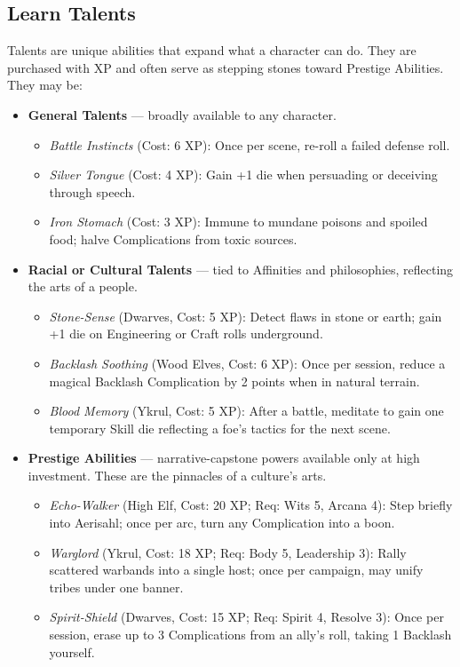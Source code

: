 \documentclass[12pt]{article}
\begin{document}
\subsection{Learn Talents}
Talents are unique abilities that expand what a character can do. They are purchased with XP and often serve as stepping stones toward Prestige Abilities. They may be:

\begin{itemize}
  \item \textbf{General Talents} — broadly available to any character.  
  \begin{itemize}
    \item \emph{Battle Instincts} (Cost: 6 XP): Once per scene, re-roll a failed defense roll.  
    \item \emph{Silver Tongue} (Cost: 4 XP): Gain +1 die when persuading or deceiving through speech.  
    \item \emph{Iron Stomach} (Cost: 3 XP): Immune to mundane poisons and spoiled food; halve Complications from toxic sources.  
  \end{itemize}

  \item \textbf{Racial or Cultural Talents} — tied to Affinities and philosophies, reflecting the arts of a people.  
  \begin{itemize}
    \item \emph{Stone-Sense} (Dwarves, Cost: 5 XP): Detect flaws in stone or earth; gain +1 die on Engineering or Craft rolls underground.  
    \item \emph{Backlash Soothing} (Wood Elves, Cost: 6 XP): Once per session, reduce a magical Backlash Complication by 2 points when in natural terrain.  
    \item \emph{Blood Memory} (Ykrul, Cost: 5 XP): After a battle, meditate to gain one temporary Skill die reflecting a foe’s tactics for the next scene.  
  \end{itemize}

  \item \textbf{Prestige Abilities} — narrative-capstone powers available only at high investment. These are the pinnacles of a culture’s arts.  
  \begin{itemize}
    \item \emph{Echo-Walker} (High Elf, Cost: 20 XP; Req: Wits 5, Arcana 4): Step briefly into Aerisahl; once per arc, turn any Complication into a boon.  
    \item \emph{Warglord} (Ykrul, Cost: 18 XP; Req: Body 5, Leadership 3): Rally scattered warbands into a single host; once per campaign, may unify tribes under one banner.  
    \item \emph{Spirit-Shield} (Dwarves, Cost: 15 XP; Req: Spirit 4, Resolve 3): Once per session, erase up to 3 Complications from an ally’s roll, taking 1 Backlash yourself.  
  \end{itemize}
\end{itemize}
\end{document}
